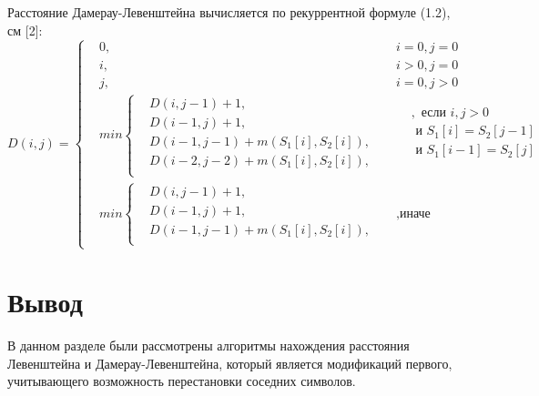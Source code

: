 \documentclass[12pt]{report}
\begin{document}
Расстояние Дамерау-Левенштейна вычисляется по рекуррентной формуле (1.2), см [2]:
		\begin{equation}
		     D(i, j) =  \left\{
			\begin{aligned}
				&0, && i = 0, j = 0\\
		    	&i, && i > 0, j = 0\\
		    	&j, && i = 0, j > 0\\		    	
		    	&min \left\{
				\begin{aligned}
					&D(i, j - 1) + 1,\\
		            &D(i - 1, j) + 1,\\
		            &D(i - 1, j - 1) + m(S_{1}[i], S_{2}[i]), \\
		            &D(i - 2, j - 2) + m(S_{1}[i], S_{2}[i]),\\
		        \end{aligned} \right.
		        && 
				\begin{aligned}
					&, \text{ если } i, j > 0 \\
		            & \text{ и } S_{1}[i] = S_{2}[j - 1] \\
		            & \text{ и } S_{1}[i - 1] =  S_{2}[j] \\
		        \end{aligned} \\ 
		        &min \left\{
		        \begin{aligned}
		            &D(i, j - 1) + 1,\\
		            &D(i - 1, j) + 1, \\
		            &D(i - 1, j - 1) + m(S_{1}[i], S_{2}[i]),\\
		        \end{aligned} \right.  &&, \text{иначе}
			\end{aligned} \right.
		\end{equation}
	    
		\section{Вывод}
		В данном разделе были рассмотрены алгоритмы нахождения расстояния Левенштейна и Дамерау-Левенштейна, который является модификаций первого, учитывающего возможность перестановки соседних символов. 
 
\end{document}
